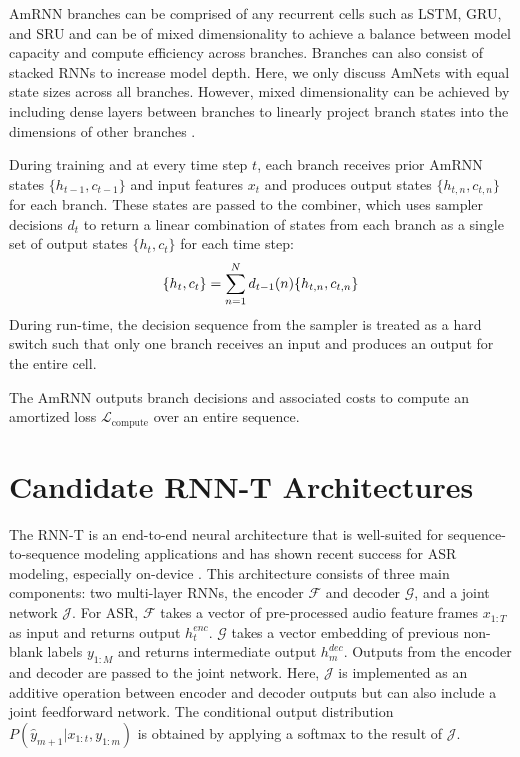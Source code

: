 \documentclass[a4paper]{article}
\newcommand{\framestep}{t}
\begin{document}
AmRNN branches can be comprised of any recurrent cells such as LSTM, GRU, and SRU and can be of mixed dimensionality to achieve a balance between model capacity and compute efficiency across branches. 
Branches can also consist of stacked RNNs to increase model depth. 
Here, we only discuss AmNets with equal state sizes across all branches. 
However, mixed dimensionality can be achieved by including dense layers between branches to linearly project branch states into the dimensions of other branches \cite{Macoskey21}.

During training and at every time step $\framestep$, each branch receives prior AmRNN states $\{h_{t-1}, c_{t-1}\}$ and input features $x_{t}$ and produces output states $\{h_{t,n}, c_{t,n}\}$ for each branch. These states are passed to the combiner, which uses sampler decisions $d_{t}$ to return a linear combination of states from each branch as a single set of output states $\{h_t, c_t\}$ for each time step:
\noindent
\begin{align}\label{eqn:states}
	\noindent
	\{h_t, c_t\} = \sum_{n=1}^{N} d_{t-1}(n) \{h_{t,n},c_{t,n}\}
\end{align}
\noindent 
During run-time, the decision sequence from the sampler is treated as a hard switch such that only one branch receives an input and produces an output for the entire cell.

The AmRNN outputs branch decisions and associated costs to compute an amortized loss $\mathcal{L}_{\text{compute}}$ over an entire sequence.

\section{Candidate RNN-T Architectures}
\label{sec:candidates}
The RNN-T is an end-to-end neural architecture that is well-suited for sequence-to-sequence modeling applications and has shown recent success for ASR modeling, especially on-device \cite{He2019}.
This architecture consists of three main components: two multi-layer RNNs, the encoder $\mathcal{F}$ and decoder $\mathcal{G}$, and a joint network $\mathcal{J}$.
For ASR, $\mathcal{F}$ takes a vector of pre-processed audio feature frames $x_{1:T}$ as input and returns output $h_t^{enc}$. 
$\mathcal{G}$ takes a vector embedding of previous non-blank labels $y_{1:M}$ and returns intermediate output $h_m^{dec}$.
Outputs from the encoder and decoder are passed to the joint network.
Here, $\mathcal{J}$ is implemented as an additive operation between encoder and decoder outputs but can also include a joint feedforward network.
The conditional output distribution $P\left(\hat{y}_{m+1}|x_{1:t}, y_{1:m}\right)$ is obtained by applying a softmax to the result of $\mathcal{J}$. 
\end{document}

